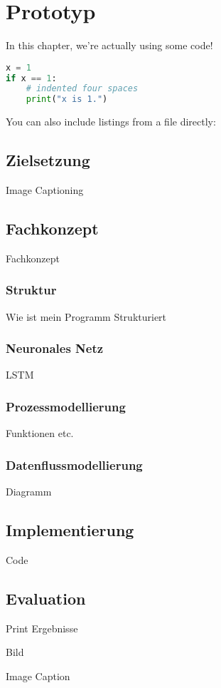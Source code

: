 \chapter{Prototyp}\label{ch:method}

In this chapter, we're actually using some code!

\begin{lstlisting}[language=Python,caption={This is an example of inline listing},captionpos=b]
x = 1
if x == 1:
    # indented four spaces
    print("x is 1.")

\end{lstlisting}

You can also include listings from a file directly:



\section{Zielsetzung}

Image Captioning

\section{Fachkonzept}

Fachkonzept

\subsection{Struktur}

Wie ist mein Programm Strukturiert

\subsection{Neuronales Netz}

LSTM

\subsection{Prozessmodellierung}

Funktionen etc.

\subsection{Datenflussmodellierung}

Diagramm

\section{Implementierung}

Code

\section{Evaluation}

Print Ergebnisse

Bild

Image Caption